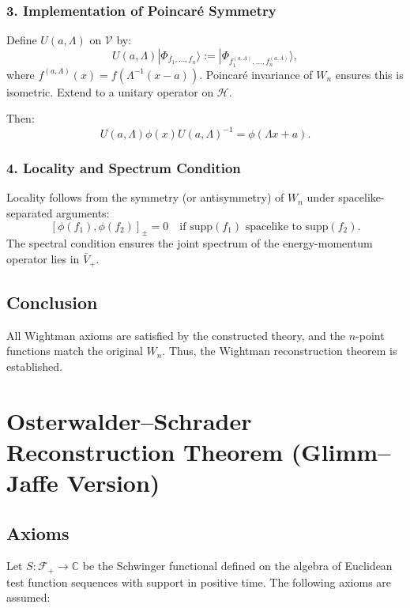 \documentclass{article}
\newcommand{\1}{\mathbbm{1}}
\theoremstyle{plain}
\theoremstyle{definition}
\numberwithin{equation}{section}
\begin{document}
\subsubsection{3. Implementation of Poincaré Symmetry}

Define $U(a, \Lambda)$ on $\mathscr{V}$ by:
\[
U(a, \Lambda) |\Phi_{f_1, \dots, f_n}\rangle := |\Phi_{f_1^{(a,\Lambda)}, \dots, f_n^{(a,\Lambda)}}\rangle,
\]
where $f^{(a,\Lambda)}(x) = f(\Lambda^{-1}(x - a))$. Poincaré invariance of $W_n$ ensures this is isometric. Extend to a unitary operator on $\mathcal{H}$.

Then:
\[
U(a, \Lambda) \phi(x) U(a, \Lambda)^{-1} = \phi(\Lambda x + a).
\]

\subsubsection{4. Locality and Spectrum Condition}

Locality follows from the symmetry (or antisymmetry) of $W_n$ under spacelike-separated arguments:
\[
[\phi(f_1), \phi(f_2)]_\pm = 0 \quad \text{if } \text{supp}(f_1) \text{ spacelike to } \text{supp}(f_2).
\]
The spectral condition ensures the joint spectrum of the energy-momentum operator lies in $\bar{V}_+$.

\subsection*{Conclusion}

All Wightman axioms are satisfied by the constructed theory, and the $n$-point functions match the original $W_n$. Thus, the Wightman reconstruction theorem is established.


\section{Osterwalder--Schrader Reconstruction Theorem (Glimm--Jaffe Version)}

\subsection*{Axioms}

Let $S: \mathcal{F}_+ \to \mathbb{C}$ be the Schwinger functional defined on the algebra of Euclidean test function sequences with support in positive time. The following axioms are assumed:
\end{document}
